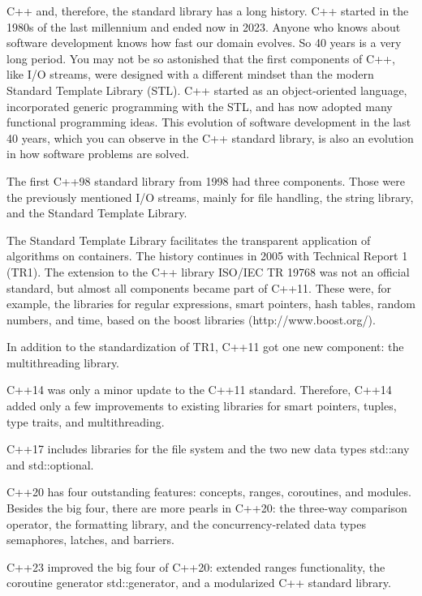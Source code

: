 C++ and, therefore, the standard library has a long history. C++ started in the 1980s of the last millennium and ended now in 2023. Anyone who knows about software development knows how fast our domain evolves. So 40 years is a very long period. You may not be so astonished that the first components of C++, like I/O streams, were designed with a different mindset than the modern Standard Template Library (STL). C++ started as an object-oriented language, incorporated generic programming with the STL, and has now adopted many functional programming ideas. This evolution of software development in the last 40 years, which you can observe in the C++ standard library, is also an evolution in how software problems are solved.


The first C++98 standard library from 1998 had three components. Those were the previously mentioned I/O streams, mainly for file handling, the string library, and the Standard Template Library.

The Standard Template Library facilitates the transparent application of algorithms on containers. The history continues in 2005 with Technical Report 1 (TR1). The extension to the C++ library ISO/IEC TR 19768 was not an official standard, but almost all components became part of C++11. These were, for example, the libraries for regular expressions, smart pointers, hash tables, random numbers, and time, based on the boost libraries (http://www.boost.org/).

In addition to the standardization of TR1, C++11 got one new component: the multithreading library.

C++14 was only a minor update to the C++11 standard. Therefore, C++14 added only a few improvements to existing libraries for smart pointers, tuples, type traits, and multithreading.

C++17 includes libraries for the file system and the two new data types std::any and std::optional.

C++20 has four outstanding features: concepts, ranges, coroutines, and modules. Besides the big four, there are more pearls in C++20: the three-way comparison operator, the formatting library, and the concurrency-related data types semaphores, latches, and barriers.

C++23 improved the big four of C++20: extended ranges functionality, the coroutine generator std::generator, and a modularized C++ standard library.













